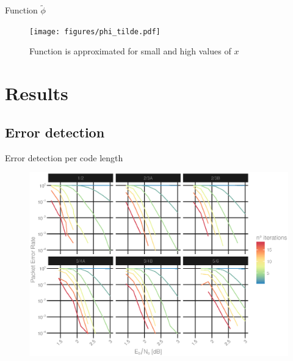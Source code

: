 \documentclass{beamer}
\begin{document}
\begin{darkframes}
  \begin{frame}{Function $\tilde{\phi}$}
    \begin{figure}[h]
      \centering
      \texttt{[image: figures/phi\_tilde.pdf]}
      \vspace{-1cm}
      \caption{Function is approximated for small and high values of $x$}
      \label{fig:phi_tilde}
    \end{figure}
  \end{frame}

  \section{Results}
  \subsection{Error detection}
  \begin{frame}{Error detection per code length}
    \begin{figure}[h]
      \centering
      \includegraphics[width=\textwidth]{figures/Pe_vs_SNR_per_length.eps}
    \end{figure}
  \end{frame}


\end{darkframes}
\end{document}
